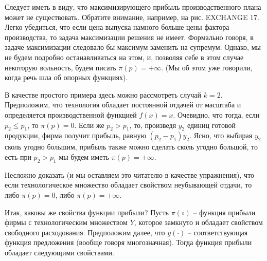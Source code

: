 Следует иметь в виду, что максимизирующего прибыль производственного плана
может не существовать. Обратите внимание, например, на рис. EXCHANGE 17.
Легко убедиться, что если цена выпуска намного больше цены фактора производства,
то задача максимизации решения не имеет. Формально говоря, в задаче максимизации
следовало бы максимум заменить на супремум. Однако, мы не будем подробно
останавливаться на этом, и, позволяя себе в этом случае некоторую вольность,
будем писать $\pi(p)=+\infty$. (Мы об этом уже говорили, когда
речь шла об опорных функциях).

В качестве простого примера здесь можно рассмотреть случай $k=2$. Предположим, что
технология обладает постоянной отдачей от масштаба и определяется производственной
функцией $f(x)=x$. Очевидно, что тогда, если $p_2\leq p_1$, то $\pi(p)=0$. Если же
$p_2>p_1$, то, произведя $y_2$ единиц готовой продукции, фирма получит прибыль,
равную $(p_2-p_1)y_2$. Ясно, что выбирая  $y_2$ сколь угодно большим, прибыль также
можно сделать сколь угодно большой, то есть при $p_2>p_1$ мы будем иметь
$\pi(p)=+\infty$.

Несложно доказать (и мы оставляем это читателю в качестве упражнения), что
если технологическое множество обладает свойством неубывающей отдачи, то либо
$\pi(p)=0$, либо $\pi(p)=+\infty$.

Итак, каковы же свойства функции прибыли?
Пусть $\pi(\circ )$ -- функция прибыли фирмы с технологическим
множеством $Y$, которое замкнуто и обладает свойством свободного
расходования. Предположим далее, что $y(\cdot)$ -- соответствующая функция
предложения (вообще говоря многозначная). Тогда функция прибыли обладает следующими свойствами.

